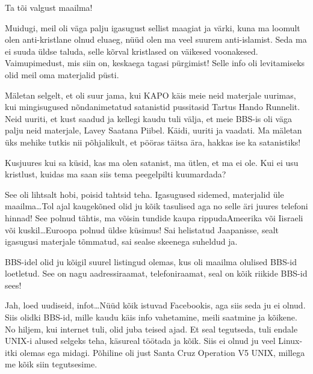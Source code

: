 
Ta tõi valgust maailma! 

Muidugi, meil oli väga palju igasugust sellist maagiat ja värki, kuna ma loomult olen anti-kristlane olnud eluaeg, nüüd olen ma veel suurem anti-islamist. Seda ma ei suuda üldse taluda,  selle kõrval kristlased on väikesed voonakesed. Vaimupimedust, mis siin on, keskaega tagasi pürgimist! Selle info oli levitamiseks olid meil oma materjalid püsti.

Mäletan selgelt, et oli suur jama, kui KAPO käis meie neid materjale uurimas, kui mingisugused nõndanimetatud satanistid pussitasid Tartus Hando Runnelit. Neid uuriti, et kust saadud ja kellegi kaudu tuli  välja, et meie BBS-is oli väga palju neid materjale, Lavey Saatana Piibel. Käidi, uuriti ja vaadati. Ma mäletan üks mehike tutkis nii põhjalikult, et pööras täitsa ära, hakkas ise ka satanistiks!

Kusjuures kui sa küsid, kas ma olen satanist, ma ütlen, et ma ei ole. Kui ei usu kristlust, kuidas ma saan siis tema peegelpilti kuumardada?


See oli lihtsalt hobi, poisid tahtsid teha. Igasugused sidemed, materjalid üle maailma\ldots Tol ajal kaugekõned olid ju kõik tasulised aga no selle äri juures telefoni hinnad! See polnud tähtis, ma võisin tundide kaupa rippudaAmeerika või Iisraeli või kuskil\ldots Euroopa polnud üldse küsimus! Sai helistatud Jaapanisse, sealt igasugusi materjale tõmmatud, sai sealse skeenega suheldud ja.


BBS-idel olid ju kõigil suurel listingud olemas, kus oli maailma olulised BBS-id loetletud. See on nagu aadressiraamat,  telefoniraamat, seal on kõik riikide BBS-id sees! 


Jah, loed uudiseid, infot\ldots Nüüd  kõik istuvad Facebookis, aga siis seda ju ei olnud. Siis olidki BBS-id, mille kaudu käis info vahetamine, meili saatmine ja kõikene. No hiljem, kui internet tuli, olid juba teised ajad. Et seal tegutseda, tuli endale UNIX-i alused selgeks teha, käsureal töötada ja kõik. Siis ei olnud ju veel Linux-itki olemas ega midagi. Põhiline oli just Santa Cruz Operation V5 UNIX, millega me kõik siin tegutsesime.

